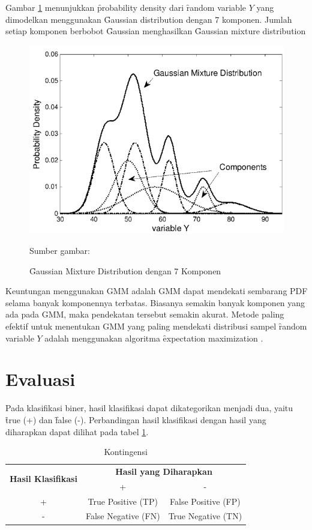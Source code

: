   Gambar \ref{fig:gmm} menunjukkan \f{probability density} dari \f{random variable} $Y$ yang dimodelkan menggunakan \f{Gaussian distribution} dengan 7 komponen. Jumlah setiap komponen berbobot \f{Gaussian} menghasilkan \f{Gaussian mixture distribution}

  \begin{figure}
    \centering
    \includegraphics[width=\linewidth]{pics/gmm}
    \caption{\f{Gaussian Mixture Distribution} dengan 7 Komponen}{Sumber gambar: \cite{6235282}}
    \label{fig:gmm}
  \end{figure}

  Keuntungan menggunakan GMM adalah GMM dapat mendekati sembarang PDF selama banyak komponennya terbatas. Biasanya semakin banyak komponen yang ada pada GMM, maka pendekatan tersebut semakin akurat. Metode paling efektif untuk menentukan GMM yang paling mendekati distribusi sampel \f{random variable} $Y$ adalah menggunakan algoritma \f{expectation maximization} \citep{singh2010statistical}.


\section{Evaluasi} \label{chap:evaluasi}
Pada klasifikasi biner, hasil klasifikasi dapat dikategorikan menjadi dua, yaitu \f{true} (+) dan \f{false} (-). Perbandingan hasil klasifikasi dengan hasil yang diharapkan dapat dilihat pada tabel \ref{table:kontingensi}.

\begin{table}
  \centering
  \caption{Kontingensi}
  \begin{tabular}{|c|c|c|}
    \hline
    \multirow{2}{7em}{\textbf{Hasil Klasifikasi}} & \multicolumn{2}{c|}{\textbf{Hasil yang Diharapkan}} \\
    \cline{2-3}
    & + & - \\
    \hline
    + & True Positive (TP) & False Positive (FP) \\
    \hline
    - & False Negative (FN) & True Negative (TN) \\
    \hline
  \end{tabular}
  \label{table:kontingensi}
\end{table}

